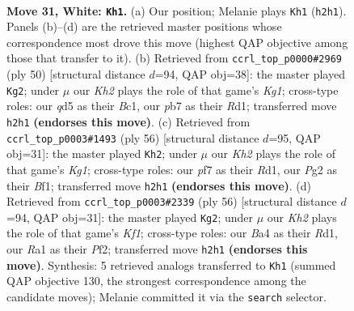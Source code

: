 \documentclass[11pt]{article}
\begin{document}
\clearpage

\begin{figure}[p]\centering
\begin{subfigure}{0.46\textwidth}\centering
\resizebox{\linewidth}{!}{%
\newchessgame
\chessboard[
  setfen={r1b5/ppp2ppk/5b1p/3q1n2/B4Q2/5P1P/PP4PK/R1B5 w - - 2 31},
  showmover=false,
  pgfstyle=straightmove, color=movearrow, markmove={h2-h1}
]}
\caption{}
\end{subfigure}\hfill
\begin{subfigure}{0.46\textwidth}\centering
\resizebox{\linewidth}{!}{%
\newchessgame
\chessboard[
  setfen={4r1k1/pp3pp1/1bp2n2/4q2p/8/P1P2QPP/1P3P2/2BR1BK1 w - - 3 26},
  showmover=false,
  pgfstyle=straightmove, color=movearrow, markmove={g1-g2}
]}
\caption{}
\end{subfigure}
\\[4pt]
\begin{subfigure}{0.46\textwidth}\centering
\resizebox{\linewidth}{!}{%
\newchessgame
\chessboard[
  setfen={6k1/1p1r1p2/p4bp1/3Pn2p/P6P/2q2PB1/4Q1P1/3R1BK1 w - - 2 29},
  showmover=false,
  pgfstyle=straightmove, color=movearrow, markmove={g1-h2}
]}
\caption{}
\end{subfigure}\hfill
\begin{subfigure}{0.46\textwidth}\centering
\resizebox{\linewidth}{!}{%
\newchessgame
\chessboard[
  setfen={3r2k1/p4ppp/1p2q3/2bpP3/3B2Q1/1P4PP/P4P2/3R1K2 w - - 0 29},
  showmover=false,
  pgfstyle=straightmove, color=movearrow, markmove={f1-g2}
]}
\caption{}
\end{subfigure}
\caption{\textbf{Move 31, White: \texttt{Kh1}.} (a) Our position; Melanie plays \texttt{Kh1} (\texttt{h2h1}). Panels (b)--(d) are the retrieved master positions whose correspondence most drove this move (highest QAP objective among those that transfer to it). (b) Retrieved from \texttt{ccrl\_top\_p0000\#2969} (ply 50) [structural distance $d$=94, QAP obj=38]: the master played \texttt{Kg2}; under $\mu$ our \emph{Kh2} plays the role of that game's \emph{Kg1}; cross-type roles: our \emph{q}d5 as their \emph{B}c1, our \emph{p}b7 as their \emph{R}d1; transferred move \texttt{h2h1} \textbf{(endorses this move)}. (c) Retrieved from \texttt{ccrl\_top\_p0003\#1493} (ply 56) [structural distance $d$=95, QAP obj=31]: the master played \texttt{Kh2}; under $\mu$ our \emph{Kh2} plays the role of that game's \emph{Kg1}; cross-type roles: our \emph{p}f7 as their \emph{R}d1, our \emph{P}g2 as their \emph{B}f1; transferred move \texttt{h2h1} \textbf{(endorses this move)}. (d) Retrieved from \texttt{ccrl\_top\_p0003\#2339} (ply 56) [structural distance $d$=94, QAP obj=31]: the master played \texttt{Kg2}; under $\mu$ our \emph{Kh2} plays the role of that game's \emph{Kf1}; cross-type roles: our \emph{B}a4 as their \emph{R}d1, our \emph{R}a1 as their \emph{P}f2; transferred move \texttt{h2h1} \textbf{(endorses this move)}. Synthesis: 5 retrieved analogs transferred to \texttt{Kh1} (summed QAP objective 130, the strongest correspondence among the candidate moves); Melanie committed it via the \texttt{search} selector.}
\label{fig:thought-m60}
\end{figure}
\end{document}
